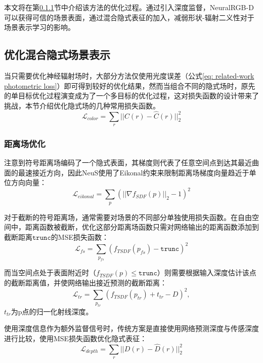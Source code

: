 本文将在第\ref{sec: related-work SDF optimization}节中介绍该方法的优化过程。通过引入深度监督，NeuralRGB-D可以获得可信的场景表面，通过混合隐式表征的加入，减弱形状-辐射二义性对于场景表示学习的影响。

\subsection{优化混合隐式场景表示}
当只需要优化神经辐射场时，大部分方法仅使用光度误差（公式\ref{eq: related-work photometric loss}）即可得到较好的优化结果，然而当组合不同的隐式场时，原先的单目标优化过程演变成为了一个多目标的优化过程，这对损失函数的设计带来了挑战，本节介绍优化隐式场的几种常用损失函数。
\begin{equation}
    \mathcal{L}_{color} = \sum_r||C(r)-\hat{C}(r)||_2^2
    \label{eq: related-work photometric loss}
\end{equation}

\subsubsection{距离场优化}
\label{sec: related-work SDF optimization}
注意到符号距离场编码了一个隐式表面，其梯度则代表了任意空间点到达其最近曲面的最速接近方向，因此NeuS\cite{wang_neus_2021}使用了Eikonal约束来限制距离场梯度向量趋近于单位方向向量：
\begin{equation}
    \mathcal{L}_{eikonal} = \sum_p(||\nabla f_{SDF}(p)||_2-1)^2
\end{equation}

对于截断的符号距离场\cite{azinovic_neural_2022}，通常需要对场景的不同部分单独使用损失函数。在自由空间中，距离函数被截断，优化这部分距离场函数只需对网络输出的距离函数添加到截断距离$\mathtt{trunc}$的MSE损失函数：
\begin{equation}
    \mathcal{L}_{fs} = \sum_{p_{fs}}(f_{TSDF}(p_{fs})-\mathtt{trunc})^2
\end{equation}

而当空间点处于表面附近时（$f_{TSDF}(p) \leq \mathtt{trunc}$）则需要根据输入深度估计该点的截断距离值，并使网络输出接近预测的截断距离：
\begin{equation}
    \mathcal{L}_{tr} = \sum_{p_{tr}}(f_{TSDF}(p_{tr})+t_{tr}-D)^2,
\end{equation}
$t_{tr}$为p点的归一化射线深度。

使用深度信息作为额外监督信号时，传统方案是直接使用网络预测深度与传感深度进行比较，使用MSE损失函数优化隐式表征：
\begin{equation}
    \mathcal{L}_{depth}=\sum_r||D(r)-\hat{D}(r)||_2^2
\end{equation}


